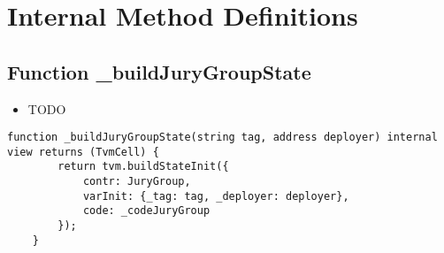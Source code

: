 \section{Internal Method Definitions}


\subsection{Function \_{}buildJuryGroupState}

\begin{itemize}
\item TODO
\end{itemize}

\begin{lstlisting}[firstnumber=14]
    function _buildJuryGroupState(string tag, address deployer) internal view returns (TvmCell) {
        return tvm.buildStateInit({
            contr: JuryGroup,
            varInit: {_tag: tag, _deployer: deployer},
            code: _codeJuryGroup
        });
    }
\end{lstlisting}
